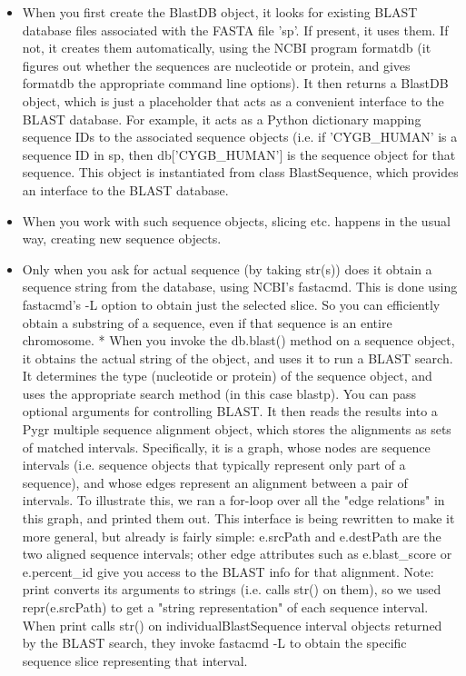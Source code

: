 \documentclass{howto}
\begin{document}
\begin{itemize}

\item
When you first create the BlastDB object, it looks for existing BLAST database files associated with the FASTA file 'sp'.  If present, it uses them.  If not, it creates them automatically, using the NCBI program formatdb (it figures out whether the sequences are nucleotide or protein, and gives formatdb the appropriate command line options).  It then returns a BlastDB object, which is just a placeholder that acts as a convenient interface to the BLAST database.  For example, it acts as a Python dictionary mapping sequence IDs to the associated sequence objects (i.e. if 'CYGB_HUMAN' is a sequence ID in sp, then db['CYGB_HUMAN'] is the sequence object for that sequence.  This object is instantiated from class BlastSequence, which provides an interface to the BLAST database.

\item 
When you work with such sequence objects, slicing etc. happens in the usual way, creating new sequence objects.

\item  
Only when you ask for actual sequence (by taking str(s)) does it obtain a sequence string from the database, using NCBI's fastacmd.  This is done using fastacmd's -L option to obtain just the selected slice.  So you can efficiently obtain a substring of a sequence, even if that sequence is an entire chromosome.
    * When you invoke the db.blast() method on a sequence object, it obtains the actual string of the object, and uses it to run a BLAST search.  It determines the type (nucleotide or protein) of the sequence object, and uses the appropriate search method (in this case blastp).  You can pass optional arguments for controlling BLAST.  It then reads the results into a Pygr multiple sequence alignment object, which stores the alignments as sets of matched intervals.  Specifically, it is a graph, whose nodes are sequence intervals (i.e. sequence objects that typically represent only part of a sequence), and whose edges represent an alignment between a pair of intervals.  To illustrate this, we ran a for-loop over all the "edge relations" in this graph, and printed them out.  This interface is being rewritten to make it more general, but already is fairly simple: e.srcPath and e.destPath are the two aligned sequence intervals; other edge attributes such as e.blast_score or e.percent_id give you access to the BLAST info for that alignment.  Note: print converts its arguments to strings (i.e. calls str() on them), so we used repr(e.srcPath) to get a "string representation" of each sequence interval.  When print calls str() on individualBlastSequence interval objects returned by the BLAST search, they invoke fastacmd -L to obtain the specific sequence slice representing that interval.
\end{itemize}
\end{document}
